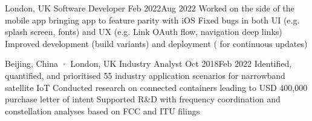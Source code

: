 

               {London, UK}
{Software Developer}                                {Feb 2022}{Aug 2022}
{Worked on the  side of the  mobile app bringing app to feature parity with iOS}
{Fixed bugs in both UI (e.g. splash screen, fonts) and UX (e.g.  Link OAuth flow, navigation deep links)}
{Improved development (build variants) and deployment ( for continuous updates)}


       {Beijing, China · London, UK}
{Industry Analyst}                                  {Oct 2018}{Feb 2022}
{Identified, quantified, and prioritised 55 industry application scenarios for narrowband satellite IoT}
{Conducted research on connected containers leading to USD 400,000 purchase letter of intent}
{Supported R\&D with frequency coordination and constellation analyses based on FCC and ITU filings}





